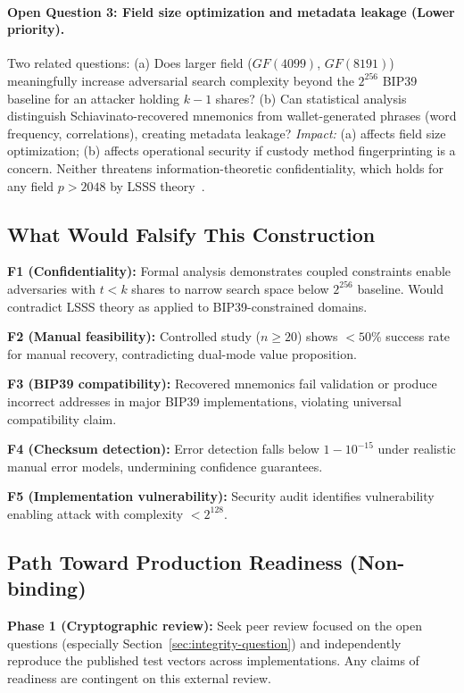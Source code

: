 \documentclass[11pt]{article}
\begin{document}
\paragraph{Open Question 3: Field size optimization and metadata leakage (Lower priority).} Two related questions: (a) Does larger field ($GF(4099)$, $GF(8191)$) meaningfully increase adversarial search complexity beyond the $2^{256}$ BIP39 baseline for an attacker holding $k-1$ shares? (b) Can statistical analysis distinguish Schiavinato-recovered mnemonics from wallet-generated phrases (word frequency, correlations), creating metadata leakage? \textit{Impact:} (a) affects field size optimization; (b) affects operational security if custody method fingerprinting is a concern. Neither threatens information-theoretic confidentiality, which holds for any field $p > 2048$ by LSSS theory~\cite{beimel2011}.

\subsection{What Would Falsify This Construction}

\textbf{F1 (Confidentiality):} Formal analysis demonstrates coupled constraints enable adversaries with $t < k$ shares to narrow search space below $2^{256}$ baseline. Would contradict LSSS theory as applied to BIP39-constrained domains.

\textbf{F2 (Manual feasibility):} Controlled study ($n \geq 20$) shows $< 50\%$ success rate for manual recovery, contradicting dual-mode value proposition.

\textbf{F3 (BIP39 compatibility):} Recovered mnemonics fail validation or produce incorrect addresses in major BIP39 implementations, violating universal compatibility claim.

\textbf{F4 (Checksum detection):} Error detection falls below $1 - 10^{-15}$ under realistic manual error models, undermining confidence guarantees.

\textbf{F5 (Implementation vulnerability):} Security audit identifies vulnerability enabling attack with complexity $< 2^{128}$.

\subsection{Path Toward Production Readiness (Non-binding)}

\textbf{Phase 1 (Cryptographic review):} Seek peer review focused on the open questions (especially Section~\ref{sec:integrity-question}) and independently reproduce the published test vectors across implementations. Any claims of readiness are contingent on this external review.
\end{document}
